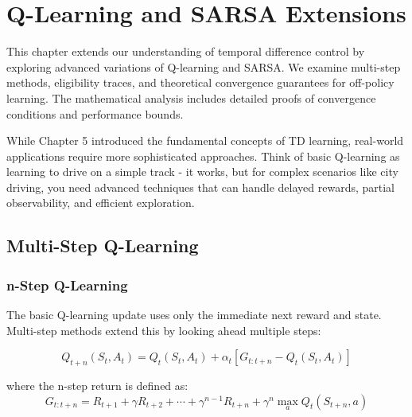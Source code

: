 \chapter{Q-Learning and SARSA Extensions}
\label{ch:q-learning-extensions}

\begin{keyideabox}
This chapter extends our understanding of temporal difference control by exploring advanced variations of Q-learning and SARSA. We examine multi-step methods, eligibility traces, and theoretical convergence guarantees for off-policy learning. The mathematical analysis includes detailed proofs of convergence conditions and performance bounds.
\end{keyideabox}

\begin{intuitionbox}
While Chapter 5 introduced the fundamental concepts of TD learning, real-world applications require more sophisticated approaches. Think of basic Q-learning as learning to drive on a simple track - it works, but for complex scenarios like city driving, you need advanced techniques that can handle delayed rewards, partial observability, and efficient exploration.
\end{intuitionbox}

\section{Multi-Step Q-Learning}

\subsection{n-Step Q-Learning}

The basic Q-learning update uses only the immediate next reward and state. Multi-step methods extend this by looking ahead multiple steps:

\begin{equation}
Q_{t+n}(S_t, A_t) = Q_t(S_t, A_t) + \alpha_t \left[ G_{t:t+n} - Q_t(S_t, A_t) \right]
\end{equation}

where the n-step return is defined as:
\begin{equation}
G_{t:t+n} = R_{t+1} + \gamma R_{t+2} + \cdots + \gamma^{n-1} R_{t+n} + \gamma^n \max_a Q_t(S_{t+n}, a)
\end{equation}

